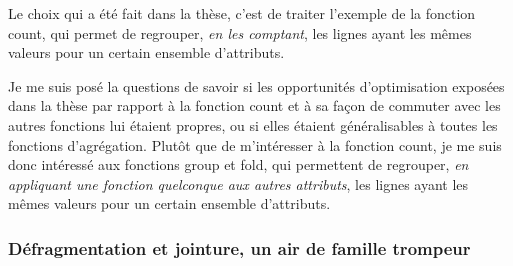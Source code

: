 Le choix qui a été fait dans la thèse, c'est de traiter l'exemple
de la fonction count, qui permet de regrouper, \emph{en les comptant},
les lignes ayant les mêmes valeurs pour un certain ensemble d'attributs.

Je me suis posé la questions de savoir si les opportunités d'optimisation
exposées dans la thèse par rapport à la fonction count et à sa façon de commuter
avec les autres fonctions lui étaient propres, ou si elles étaient généralisables
à toutes les fonctions d'agrégation. Plutôt que de m'intéresser à la fonction
count, je me suis donc intéressé aux fonctions group et fold, qui permettent
de regrouper, \emph{en appliquant une fonction quelconque aux autres attributs},
les lignes ayant les mêmes valeurs pour un certain ensemble d'attributs.

\subsubsection*{Défragmentation et jointure, un air de famille trompeur}